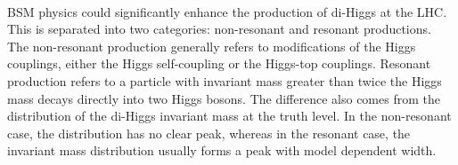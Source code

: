 \paragraph{}
BSM physics could significantly enhance the production of di-Higgs at the LHC. This is separated into two categories: non-resonant and resonant productions. The non-resonant production generally refers to modifications of the Higgs couplings, either the Higgs self-coupling or the Higgs-top couplings. Resonant production refers to a particle with invariant mass greater than twice the Higgs mass decays directly into two Higgs bosons. The difference also comes from the distribution of the di-Higgs invariant mass at the truth level. In the non-resonant case, the distribution has no clear peak, whereas in the resonant case, the invariant mass distribution usually forms a peak with model dependent width. 


